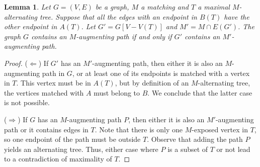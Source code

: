 \documentclass{tufte-handout}
\newtheorem{lem}[thm]{Lemma}
\theoremstyle{definition}
\theoremstyle{remark}
\begin{document}
\begin{lem}
	Let $G=(V,E)$ be a graph, $M$ a matching and $T$ a maximal $M$-alternating tree. Suppose that all the edges with an endpoint in $B(T)$ have the other endpoint in $A(T)$. Let $G' = G[V-V(T)]$ and $M' = M \cap E(G')$. The graph $G$ contains an $M$-augmenting path if and only if $G'$ contains an $M'$-augmenting path.
\end{lem}
\begin{proof}
	($\Leftarrow$) If $G'$ has an $M'$-augmenting path, then either it is also an $M$-augmenting path in $G$, or at least one of its endpoints is matched with a vertex in $T$. This vertex must be in $A(T)$, but by definition of an $M$-alternating tree, the vertices matched with $A$ must belong to $B$. We conclude that the latter case is not possible.
	
	($\Rightarrow$) If $G$ has an $M$-augmenting path $P$, then either it is also an $M'$-augmenting path or it contains edges in $T$. Note that there is only one $M$-exposed vertex in $T$, so one endpoint of the path must be outside $T$. Observe that adding the path $P$ yields an alternating tree. Thus, either case where $P$ is a subset of $T$ or not lead to a contradiction of maximality of $T$.
\end{proof}
\end{document}
